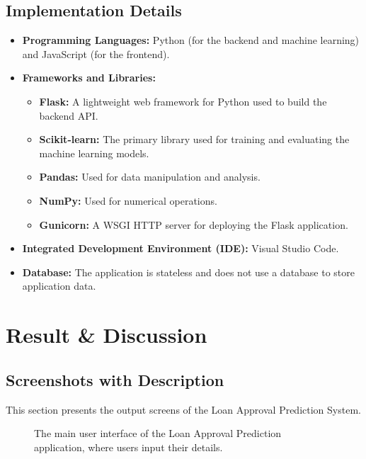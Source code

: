 \documentclass{report}
\begin{document}
\section{Implementation Details}
\begin{itemize}
    \item \textbf{Programming Languages:} Python (for the backend and machine learning) and JavaScript (for the frontend).
    \item \textbf{Frameworks and Libraries:}
    \begin{itemize}
        \item \textbf{Flask:} A lightweight web framework for Python used to build the backend API.
        \item \textbf{Scikit-learn:} The primary library used for training and evaluating the machine learning models.
        \item \textbf{Pandas:} Used for data manipulation and analysis.
        \item \textbf{NumPy:} Used for numerical operations.
        \item \textbf{Gunicorn:} A WSGI HTTP server for deploying the Flask application.
    \end{itemize}
    \item \textbf{Integrated Development Environment (IDE):} Visual Studio Code.
    \item \textbf{Database:} The application is stateless and does not use a database to store application data.
\end{itemize}

\chapter{Result & Discussion}

\section{Screenshots with Description}
This section presents the output screens of the Loan Approval Prediction System.

\begin{figure}[h!]
\centering
{}
\caption{The main user interface of the Loan Approval Prediction application, where users input their details.}
\end{figure}
\end{document}
